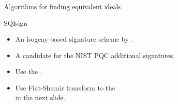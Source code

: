 \begin{frame}{Algorithms for finding equivalent ideals}
    
\end{frame}

\begin{frame}{SQIsign}
    \begin{itemize}
        \setlength{\itemsep}{10pt}
        \item An isogeny-based signature scheme by \cite{AC:DKLPW20}.
        \item A candidate for the NIST PQC additional signatures.
        \item Use the .
        \item Use Fiat-Shamir transform to the \\ in the next slide.
    \end{itemize}
\end{frame}

